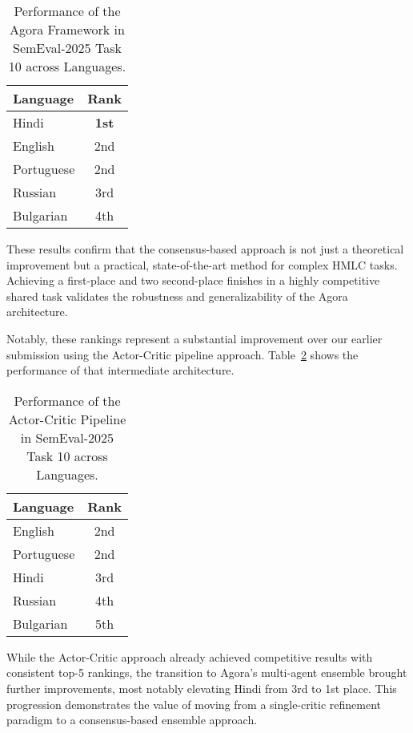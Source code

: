\begin{table}[ht]
\centering
\caption{Performance of the Agora Framework in SemEval-2025 Task 10 across Languages.}
\label{tab:semeval_rankings}
\begin{tabular}{lc}
\hline
\textbf{Language} & \textbf{Rank} \\
\hline
Hindi & \textbf{1st} \\
English & 2nd \\
Portuguese & 2nd \\
Russian & 3rd \\
Bulgarian & 4th \\
\hline
\end{tabular}
\end{table}

These results confirm that the consensus-based approach is not just a theoretical improvement but a practical, state-of-the-art method for complex HMLC tasks. Achieving a first-place and two second-place finishes in a highly competitive shared task validates the robustness and generalizability of the Agora architecture.

Notably, these rankings represent a substantial improvement over our earlier submission using the Actor-Critic pipeline approach. Table~\ref{tab:actor_critic_rankings} shows the performance of that intermediate architecture.

\begin{table}[ht]
\centering
\caption{Performance of the Actor-Critic Pipeline in SemEval-2025 Task 10 across Languages.}
\label{tab:actor_critic_rankings}
\begin{tabular}{lc}
\hline
\textbf{Language} & \textbf{Rank} \\
\hline
English & 2nd \\
Portuguese & 2nd \\
Hindi & 3rd \\
Russian & 4th \\
Bulgarian & 5th \\
\hline
\end{tabular}
\end{table}

While the Actor-Critic approach already achieved competitive results with consistent top-5 rankings, the transition to Agora's multi-agent ensemble brought further improvements, most notably elevating Hindi from 3rd to 1st place. This progression demonstrates the value of moving from a single-critic refinement paradigm to a consensus-based ensemble approach.


